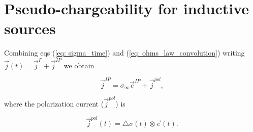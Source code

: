 \documentclass[extra,mreferee]{gji}
\newcommand{\siginf}{\sigma_\infty}
\newcommand{\dsig}{\triangle\sigma}
\renewcommand {\j}  { {\vec j} }
\newcommand {\e}  { {\vec e} }
\begin{document}
\section{Pseudo-chargeability for inductive sources}
Combining eqs (\ref{eq: sigma_time}) and  (\ref{eq: ohms_law_convolution}) writing $\j(t)=\j^F + \j^{IP}$ we obtain
\begin{linenomath*}
\begin{equation}
  \j^{IP} = \siginf \e^{IP} + \j^{pol},
  \label{eq:IP_current}
\end{equation}
\end{linenomath*}
where the polarization current ($\j^{pol}$) is
\begin{linenomath*}
\begin{equation}
  \j^{pol}(t) = \dsig(t) \otimes \e(t).
  \label{eq:polarization_current}
\end{equation}
\end{linenomath*}
\end{document}
